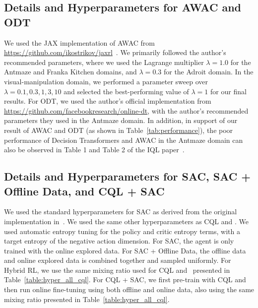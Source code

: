 \subsection{Details and Hyperparameters for AWAC and ODT}
We used the JAX implementation of AWAC from \url{https://github.com/ikostrikov/jaxrl}~\cite{jaxrl}. We primarily followed the author's recommended parameters, where we used the Lagrange multiplier $\lambda = 1.0$ for the Antmaze and Franka Kitchen domains, and $\lambda = 0.3$ for the Adroit domain. In the visual-manipulation domain, we performed a parameter sweep over $\lambda = 0.1, 0.3, 1, 3, 10$ and selected the best-performing value of $\lambda = 1$ for our final results. For ODT, we used the author's official implementation from \url{https://github.com/facebookresearch/online-dt}, with the author's recommended parameters they used in the Antmaze domain. In addition, in support of our result of AWAC and ODT (as shown in Table~\ref{tab:performance}), the poor performance of Decision Transformers and AWAC in the Antmaze domain can also be observed in Table 1 and Table 2 of the IQL paper~\citep{kostrikov2021offlineb}.

\subsection{Details and Hyperparameters for SAC, SAC + Offline Data, and CQL + SAC}
We used the standard hyperparameters for SAC as derived from the original implementation in~\cite{sac}. We used the same other hyperparameters as CQL and \methodname. We used automatic entropy tuning for the policy and critic entropy terms, with a target entropy of the negative action dimension. For SAC, the agent is only trained with the online explored data. For SAC + Offline Data, the offline data and online explored data is combined together and sampled uniformly. For Hybrid RL, we use the same mixing ratio used for CQL and \methodname\ presented in Table~\ref{table:hyper_all_cql}. For CQL + SAC, we first pre-train with CQL and then run online fine-tuning using both offline and online data, also using the same mixing ratio presented in Table~\ref{table:hyper_all_cql}. 

